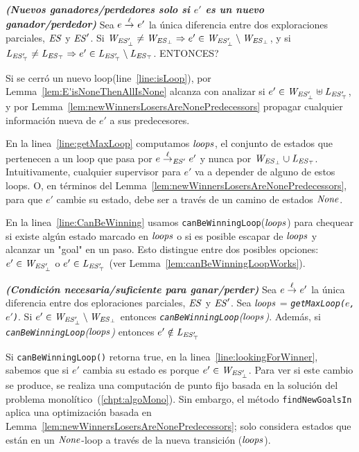 \begin{lemma}\textbf{\emph{(Nuevos ganadores/perdedores solo si $e'$ es un nuevo ganador/perdedor)}}
\label{lem:E'isNoneThenAllIsNone}
Sea $e \overset{\ell}{\rightarrow}_{} e'$ la única diferencia entre dos exploraciones parciales, $\mathit{ES}$ y $\mathit{ES}'$. Si $\mathit{W_{\mathit{\mathit{ES}'_{\bot}}}} \neq \mathit{W_{\mathit{\mathit{ES}_{\bot}}}} \Rightarrow e' \in \mathit{W_{\mathit{\mathit{ES}'_{\bot}}}} \setminus \mathit{W_{\mathit{\mathit{ES}_{\bot}}}}$, y si $\mathit{L_{\mathit{\mathit{ES}'_{\top}}}} \neq \mathit{L_{\mathit{\mathit{ES}_{\top}}}} \Rightarrow e' \in \mathit{L_{\mathit{\mathit{ES}'_{\top}}}} \setminus \mathit{L_{\mathit{\mathit{ES}_{\top}}}}$. ENTONCES?
\end{lemma}


Si se cerró un nuevo loop(line~\ref{line:isLoop}), por Lemma~\ref{lem:E'isNoneThenAllIsNone} alcanza con analizar si $e' 
\in \mathit{W_{\mathit{\mathit{ES}'_{\bot}}}} \uplus \mathit{L_{\mathit{\mathit{ES}'_{\top}}}}$, y por Lemma~\ref{lem:newWinnersLosersAreNonePredecessors} propagar cualquier información nueva de $e'$ a sus predecesores. 

En la linea~\ref{line:getMaxLoop} computamos $\mathit{loops}$, el conjunto de estados que pertenecen a un loop que pasa por $e \overset{\ell}{\rightarrow}_{\mathit{ES}'} e'$ y nunca por $\mathit{W_{\mathit{\mathit{ES}_{\bot}}}} \cup \mathit{L_{\mathit{\mathit{ES}_{\top}}}}$. 
Intuitivamente, cualquier supervisor para $e'$ va a depender de alguno de estos loops. O, en términos del Lemma~\ref{lem:newWinnersLosersAreNonePredecessors}, para que $e'$ cambie su estado, debe ser a través de un camino de estados $\mathit{None}$. 

En la linea~\ref{line:CanBeWinning} usamos \texttt{canBeWinningLoop}($\mathit{loops}$) para chequear si existe algún estado marcado en $\mathit{loops}$ o si es posible escapar de $\mathit{loops}$ y alcanzar un "goal" en un paso. Esto distingue entre dos posibles opciones: $e' \in \mathit{W_{\mathit{\mathit{ES}'_{\bot}}}}$ o $e' \in \mathit{L_{\mathit{\mathit{ES}'_{\top}}}}$ (ver 
Lemma~\ref{lem:canBeWinningLoopWorks}). 

\begin{lemma}\textbf{\emph{(Condición necesaria/suficiente para ganar/perder)}}
\label{lem:canBeWinningLoopWorks}
Sea $e \overset{\ell}{\rightarrow}_{} e'$ la única diferencia entre dos eploraciones parciales, 
$\mathit{ES}$ y $\mathit{ES}'$. Sea $\mathit{loops}$ = \emph{\texttt{getMaxLoop($e$, 
$e'$)}}.
Si $e' \in \mathit{W_{\mathit{\mathit{ES}'_{\bot}}}} \setminus \mathit{W_{\mathit{\mathit{ES}_{\bot}}}}$ 
entonces \emph{\texttt{canBeWinningLoop}($\mathit{loops}$)}. Además, si \\ 
\emph{\texttt{canBeWinningLoop}($\mathit{loops}$)} entonces $e' \notin \mathit{L_{\mathit{\mathit{ES}'_{\top}}}}$ 
\end{lemma}


Si \texttt{canBeWinningLoop()} retorna true, en la  linea~\ref{line:lookingForWinner}, 
sabemos que si $e'$ cambia su estado es porque $e' \in \mathit{W_{\mathit{\mathit{ES}'_{\bot}}}}$. Para ver si este cambio se produce, se realiza una computación de punto fijo basada en la solución del problema monolítico~(\ref{chpt:algoMono}). 
Sin embargo, el método \texttt{findNewGoalsIn} aplica una optimización basada en Lemma~\ref{lem:newWinnersLosersAreNonePredecessors}; solo considera estados que están en un $\mathit{None}$-loop a través de la nueva transición ($\mathit{loops}$).

